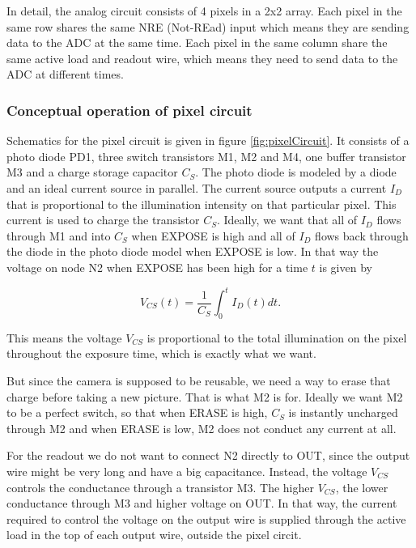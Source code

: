 In detail, the analog circuit consists of 4 pixels in a 2x2 array. Each pixel in the same row shares the same NRE (Not-REad) input which means they are sending data to the ADC at the same time. Each pixel in the same column share the same active load and readout wire, which means they need to send data to the ADC at different times.

\subsubsection{Conceptual operation of pixel circuit}

Schematics for the pixel circuit is given in figure \ref{fig:pixelCircuit}. It consists of a photo diode PD1, three switch transistors M1, M2 and M4, one buffer transistor M3 and a charge storage capacitor $C_S$. The photo diode is modeled by a diode and an ideal current source in parallel. The current source outputs a current $I_D$ that is proportional to the illumination intensity on that particular pixel. This current is used to charge the transistor $C_S$. Ideally, we want that all of $I_D$ flows through M1 and into $C_S$ when EXPOSE is high and all of $I_D$ flows back through the diode in the photo diode model when EXPOSE is low. In that way the voltage on node N2 when EXPOSE has been high for a time $t$ is given by

\begin{equation}
    V_{CS}(t) = \frac{1}{C_S} \int_0^t I_D(t) dt.
\end{equation}

This means the voltage $V_{CS}$ is proportional to the total illumination on the pixel throughout the exposure time, which is exactly what we want.

But since the camera is supposed to be reusable, we need a way to erase that charge before taking a new picture. That is what M2 is for. Ideally we want M2 to be a perfect switch, so that when ERASE is high, $C_S$ is instantly uncharged through M2 and when ERASE is low, M2 does not conduct any current at all.

For the readout we do not want to connect N2 directly to OUT, since the output wire might be very long and have a big capacitance. Instead, the voltage $V_{CS}$ controls the conductance through a transistor M3. The higher $V_{CS}$, the lower conductance through M3 and higher voltage on OUT. In that way, the current required to control the voltage on the output wire is supplied through the active load in the top of each output wire, outside the pixel circit.

